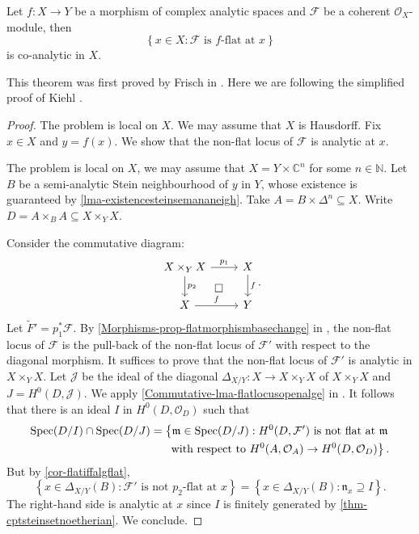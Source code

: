 \begin{thm}
    Let $f:X\rightarrow Y$ be a morphism of complex analytic spaces and $\mathcal{F}$ be a coherent $\mathcal{O}_X$-module, then
    \[
        \left\{ x\in X: \mathcal{F}\text{ is }f\text{-flat at }x   \right\}
    \]  
    is co-analytic in $X$.
\end{thm}
This theorem was first proved by Frisch in \cite{Fri67}. Here we are following the simplified proof of Kiehl \cite{Kie67}.
\begin{proof}
    The problem is local on $X$. We may assume that $X$ is Hausdorff.
    Fix $x\in X$ and $y=f(x)$. We show that the non-flat locus of $\mathcal{F}$ is analytic at $x$. 

    The problem is local on $X$, we may assume that $X=Y\times \mathbb{C}^n$ for some $n\in \mathbb{N}$.
    Let $B$ be a semi-analytic Stein neighbourhood of $y$ in $Y$, whose existence is guaranteed by \cref{lma-existencesteinsemananeigh}. Take $A=B\times \Delta^n\subseteq X$. Write $D=A\times_B A\subseteq X\times_Y X$.

    Consider the commutative diagram:
    \[
        \begin{tikzcd}
            X\times_Y X \arrow[r,"p_1"] \arrow[d,"p_2"] \arrow[rd, "\square", phantom] & X \arrow[d, "f"] \\
            X \arrow[r, "f"]                                               & Y               
        \end{tikzcd}.    
    \]
    Let $\tilde{F}'=p_1^*\mathcal{F}$.
    By \cref{Morphisms-prop-flatmorphismbasechange}  in , the non-flat locus of $\mathcal{F}$ is the pull-back of the non-flat locus of $\mathcal{F}'$ with respect to the diagonal morphism. It suffices to prove that the non-flat locus of $\mathcal{F}'$ is analytic in $X\times_Y X$. Let $\mathcal{J}$ be the ideal of the diagonal $\Delta_{X/Y}:X\rightarrow X\times_Y X$ of $X\times_Y X$ and $J=H^0(D,\mathcal{J})$. We apply \cref{Commutative-lma-flatlocusopenalge} in . It follows that there is an ideal $I$ in $H^0(D,\mathcal{O}_D)$ such that
    \[
        \begin{split}
        \operatorname{Spec} (D/I)\cap \operatorname{Spec} (D/J)=\left\{\mathfrak{m}\in \operatorname{Spec} (D/J): H^0(D,\mathcal{F}')\text{ is not flat at }\mathfrak{m}\right.\\
        \left.\text{ with respect to } H^0(A,\mathcal{O}_A)\rightarrow H^0(D,\mathcal{O}_D) \right\}.  
        \end{split}
    \]
    But by \cref{cor-flatiffalgflat},
    \[
        \left\{x\in \Delta_{X/Y}(B): \mathcal{F}'\text{ is not } p_2\text{-flat at }x  \right\}=\left\{ x\in \Delta_{X/Y}(B): \mathfrak{n}_x\supseteq I\right\}.  
    \]
    The right-hand side is analytic at $x$ since $I$ is finitely generated by \cref{thm-cptsteinsetnoetherian}.
    We conclude.
\end{proof}

\printbibliography
